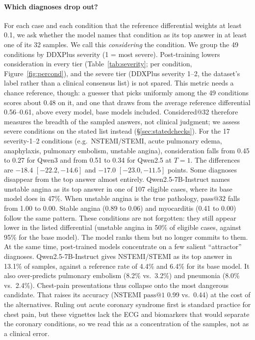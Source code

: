 \documentclass[11pt]{article}
\makeatletter
\newcommand{\passk}[1]{\mathrm{pass@}#1}
\makeatother
\begin{document}
\paragraph{Which diagnoses drop out?}
For each case and each condition that the reference differential weights at least 0.1, we ask whether the model names that condition as its top answer in at least one of its 32 samples. We call this \emph{considering} the condition.
We group the 49 conditions by DDXPlus severity (1 = most severe).
Post-training lowers consideration in every tier (Table~\ref{tab:severity}; per condition, Figure~\ref{fig:percond}), and the severe tier (DDXPlus severity 1--2, the dataset's label rather than a clinical consensus list) is not spared. This metric needs a chance reference, though: a guesser that picks uniformly among the 49 conditions scores about 0.48 on it, and one that draws from the average reference differential 0.56--0.61, above every model, base models included. Considered@32 therefore measures the breadth of the sampled answers, not clinical judgment; we assess severe conditions on the stated list instead (\S\ref{sec:statedchecks}).
For the 17 severity-1--2 conditions (e.g.\ NSTEMI/STEMI, acute pulmonary edema, anaphylaxis, pulmonary embolism, unstable angina), consideration falls from 0.45 to 0.27 for Qwen3 and from 0.51 to 0.34 for Qwen2.5 at $T{=}1$. The differences are $-18.4$ $[-22.2,-14.6]$ and $-17.0$ $[-23.0,-11.5]$ points.
Some diagnoses disappear from the top answer almost entirely.
Qwen2.5-7B-Instruct names unstable angina as its top answer in one of 107 eligible cases, where its base model does in 47\%. When unstable angina is the true pathology, $\passk{32}$ falls from 1.00 to 0.00. Stable angina (0.89 to 0.06) and myocarditis (0.41 to 0.00) follow the same pattern.
These conditions are not forgotten: they still appear lower in the listed differential (unstable angina in 50\% of eligible cases, against 95\% for the base model). The model ranks them but no longer commits to them.
At the same time, post-trained models concentrate on a few salient ``attractor'' diagnoses.
Qwen2.5-7B-Instruct gives NSTEMI/STEMI as its top answer in 13.1\% of samples, against a reference rate of 4.4\% and 6.4\% for its base model. It also over-predicts pulmonary embolism (8.2\% vs.\ 3.2\%) and pneumonia (8.0\% vs.\ 2.4\%).
Chest-pain presentations thus collapse onto the most dangerous candidate. That raises its accuracy (NSTEMI $\passk{1}$ 0.99 vs.\ 0.44) at the cost of the alternatives. Ruling out acute coronary syndrome first is standard practice for chest pain, but these vignettes lack the ECG and biomarkers that would separate the coronary conditions, so we read this as a concentration of the samples, not as a clinical error.
\end{document}
